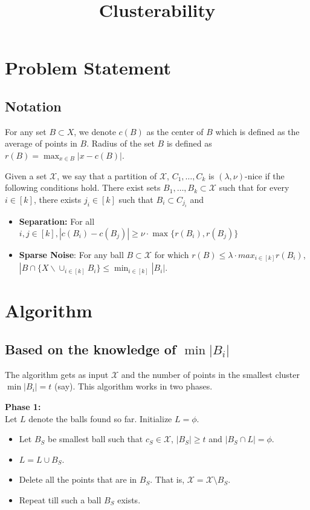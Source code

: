 \documentclass[11pt]{article}
\title{\LARGE Clusterability}
\author{}
\begin{document}
\maketitle

\section{Problem Statement}

\subsection{Notation}
For any set $B\subset X$, we denote $c(B)$ as the center of $B$ which is defined as the average of points in $B$. Radius of the set $B$ is defined as $r(B)=\max_{x\in B} |x-c(B)|$.

\begin{definition}
Given a set $\mathcal{X}$, we say that a partition of $\mathcal{X}$, $C_1,\ldots,C_k$ is $(\lambda,\nu)$-nice if the following conditions hold. There exist sets $B_1,\ldots,B_k\subset \mathcal{X}$ such that for every $i\in[k]$, there exists $j_i\in[k]$ such that $B_i\subset C_{j_i}$ and
\begin{itemize}
\item{\bf{Separation}:} For all $i,j\in[k], |c(B_i)-c(B_j)|\geq \nu\cdot\max\{r(B_i),r(B_j)\}$
\item{\bf{Sparse Noise}}: For any ball $B\subset \mathcal{X}$ for which $r(B)\leq \lambda \cdot max_{i\in[k]} r(B_i)$, $|B\cap \{X \backslash \cup_{i\in[k]} B_i\}\leq \min_{i\in[k]}|B_i|$.
\end{itemize}
\end{definition}

\section{Algorithm}

\subsection{Based on the knowledge of $\min |B_i|$}
The algorithm gets as input $\mathcal{X}$ and the number of points in the smallest cluster $\min |B_i| = t$ (say). This algorithm works in two phases.

\noindent \textbf{Phase 1:}\\ Let $L$ denote the balls found so far. Initialize $L = \phi$.
\begin{itemize}
\item Let $B_S$ be smallest ball such that $c_S \in \mathcal{X}$, $|B_S| \ge t$  and $|B_S \cap L | = \phi$.
\item $L = L \cup B_S$.
\item Delete all the points that are in $B_S$. That is, $\mathcal{X} = \mathcal{X}\setminus B_S$.
\item Repeat till such a ball $B_S$ exists.
\end{itemize}
\end{document}
